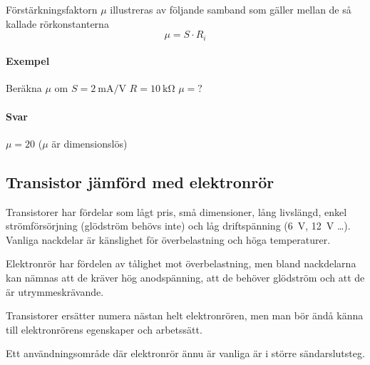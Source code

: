 Förstärkningsfaktorn \(\mu \) illustreras av följande samband som gäller mellan
de så kallade rörkonstanterna
\[\mu = S \cdot R_i\]
\paragraph{Exempel}
Beräkna \(\mu\)  om \(S = \SI{2}{\milli\ampere\per\volt}\) \(R = \SI{10}{\kilo\ohm}\) \(\mu = ?\)

\paragraph{Svar} \(\mu = 20\) (\(\mu\)  är dimensionslös)

\subsection{Transistor jämförd med elektronrör}

Transistorer har fördelar som lågt pris, små dimensioner, lång livslängd, enkel
strömförsörjning (glödström behövs inte) och låg driftspänning (\SI{6}{\volt},
\SI{12}{\volt} \ldots ).
Vanliga nackdelar är känslighet för överbelastning och höga temperaturer.

Elektronrör har fördelen av tålighet mot överbelastning, men bland nackdelarna
kan nämnas att de kräver hög anodspänning, att de behöver glödström och att de
är utrymmeskrävande.

Transistorer ersätter numera nästan helt elektronrören, men man bör ändå känna
till elektronrörens egenskaper och arbetssätt.

Ett användningsområde där elektronrör ännu är vanliga är i större
sändarslutsteg.

